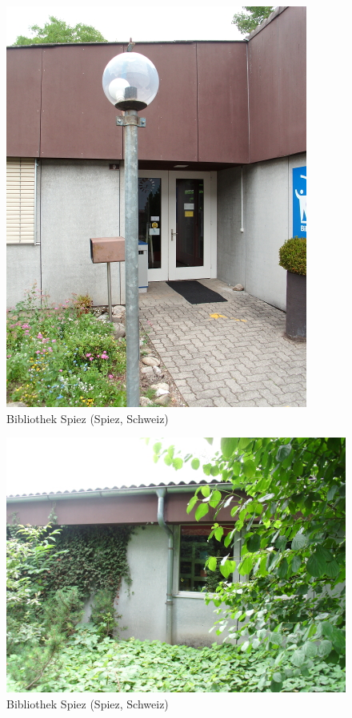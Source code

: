 \documentclass[a4paper,
fontsize=11pt,
oneside,
numbers=noperiodatend,
parskip=half-,
bibliography=totoc,
final
]{scrartcl}
\begin{document}
\begin{figure}[htbp]
\centering
\includegraphics{./img/059.jpg}
\caption{Bibliothek Spiez (Spiez,
Schweiz)}
\end{figure}

\begin{figure}[htbp]
\centering
\includegraphics{./img/060.jpg}
\caption{Bibliothek Spiez (Spiez,
Schweiz)}
\end{figure}
\end{document}
